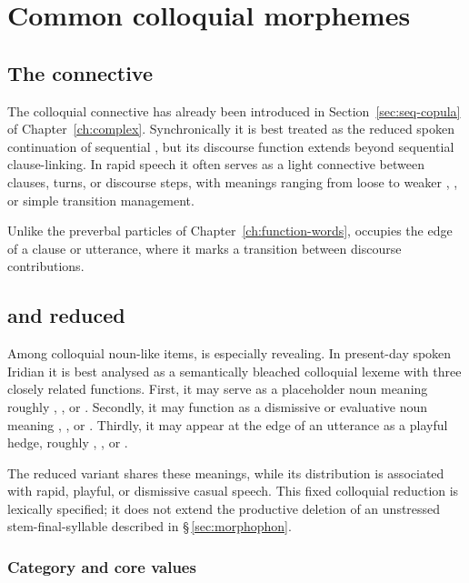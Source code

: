 \section{Common colloquial morphemes}\label{sec:spoken-morphemes}

\subsection{The connective }\label{sec:spoken-nu}

The colloquial connective  has already been introduced in
Section~\ref{sec:seq-copula} of Chapter~\ref{ch:complex}. Synchronically it is
best treated as the reduced spoken continuation of sequential , but
its discourse function extends beyond sequential clause-linking. In
rapid speech it often serves as a light connective between clauses, turns, or
discourse steps, with meanings ranging from loose  to weaker
, , or simple transition management.

Unlike the preverbal particles of Chapter~\ref{ch:function-words},
 occupies the edge of a clause or utterance, where it marks a
transition between discourse contributions.

\subsection{ and reduced }\label{sec:spoken-zema}

Among colloquial noun-like items,  is especially revealing. In
present-day spoken Iridian it is best analysed as a semantically bleached
colloquial lexeme with three closely related functions. First, it may serve as
a placeholder noun meaning roughly , , or
. Secondly, it may function as a dismissive or
evaluative noun meaning , , or . Thirdly, it may appear at the edge of an utterance as a playful hedge,
roughly , , or .

The reduced variant  shares these meanings, while its distribution
is associated with rapid, playful, or dismissive casual speech. This fixed
colloquial reduction is lexically specified; it does not extend the productive
deletion of an unstressed stem-final-syllable  described in §\,\ref{sec:morphophon}.

\subsubsection{Category and core values}

